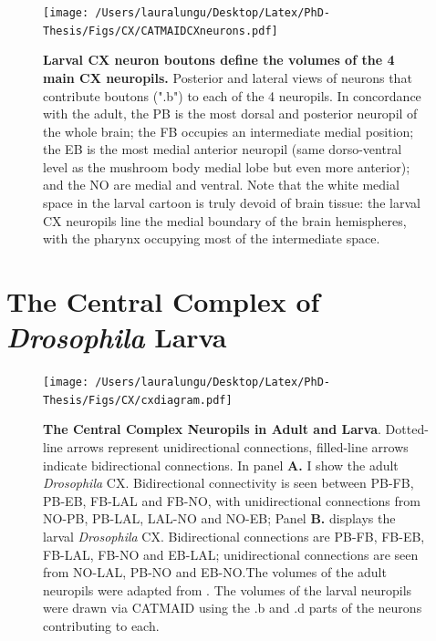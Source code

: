         \begin{figure}
            \centering
            \texttt{[image: /Users/lauralungu/Desktop/Latex/PhD-Thesis/Figs/CX/CATMAIDCXneurons.pdf]}
            \caption[Larval CX neuron boutons define the volumes of the 4 main CX neuropils]{\textbf{Larval CX neuron boutons define the volumes of the 4 main CX neuropils.} Posterior and lateral views of neurons that contribute boutons (".b") to each of the 4 neuropils. In concordance with the adult, the PB is the most dorsal and posterior neuropil of the whole brain; the FB occupies an intermediate medial position; the EB is the most medial anterior neuropil (same dorso-ventral level as the mushroom body medial lobe but even more anterior); and the NO are medial and ventral. Note that the white medial space in the larval cartoon is truly devoid of brain tissue: the larval CX neuropils line the medial boundary of the brain hemispheres, with the pharynx occupying most of the intermediate space.
            }
            \label{cxneuropils}
        \end{figure}    

\section{The Central Complex of \textit{Drosophila} Larva}
\label{CXLarva}
    \begin{figure}[H]
        \centering
        \texttt{[image: /Users/lauralungu/Desktop/Latex/PhD-Thesis/Figs/CX/cxdiagram.pdf]}
        \caption[The Central Complex Neuropils in Adult and Larva]{\textbf{The Central Complex Neuropils in Adult and Larva}. Dotted-line arrows represent unidirectional connections, filled-line arrows indicate bidirectional connections. In panel \textbf{A.} I show the adult \textit{\textit{Drosophila}} CX. Bidirectional connectivity is seen between PB-FB, PB-EB, FB-LAL and FB-NO, with unidirectional connections from NO-PB, PB-LAL, LAL-NO and NO-EB; Panel \textbf{B.} displays the larval \textit{Drosophila} CX. Bidirectional connections are  PB-FB, FB-EB, FB-LAL, FB-NO and EB-LAL; unidirectional connections are seen from NO-LAL, PB-NO and EB-NO.The volumes of the adult neuropils were adapted from \citep{franconville2018building}.
        The volumes of the larval neuropils were drawn via CATMAID using the .b and .d parts of the neurons contributing to each.}
        \label{cxdiagram}
    \end{figure}

